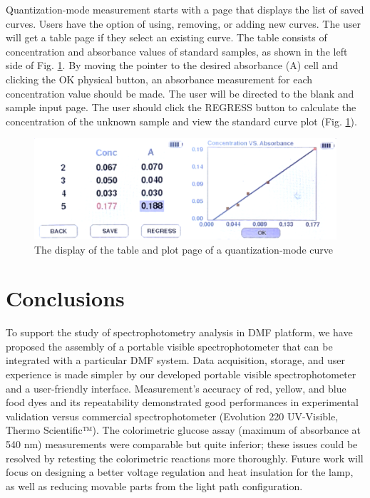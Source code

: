 \documentclass[conference]{IEEEtran}
\begin{document}
Quantization-mode measurement starts with a page that displays the list of saved curves.
Users have the option of using, removing, or adding new curves.
The user will get a table page if they select an existing curve.
The table consists of concentration and absorbance values of standard samples, as shown in the left side of Fig. \ref{lcd-conc}.
By moving the pointer to the desired absorbance (A) cell and clicking the OK physical button, an absorbance measurement for each concentration value should be made.
The user will be directed to the blank and sample input page.
The user should click the REGRESS button to calculate the concentration of the unknown sample and view the standard curve plot (Fig. \ref{lcd-conc}).

    \begin{figure}[htbp]
    \centerline{\includegraphics[scale=0.06]{lcd-conc.png}}
    \caption{The display of the table and plot page of a quantization-mode curve}
    \label{lcd-conc}
    \end{figure}

\section{Conclusions}
To support the study of spectrophotometry analysis in DMF platform, we have proposed the assembly of a portable visible spectrophotometer that can be integrated with a particular DMF system.
Data acquisition, storage, and user experience is made simpler by our developed portable visible spectrophotometer and a user-friendly interface.
Measurement's accuracy of red, yellow, and blue food dyes and its repeatability demonstrated good performances in experimental validation versus commercial spectrophotometer (Evolution 220 UV-Visible, Thermo Scientific™).
The colorimetric glucose assay (maximum of absorbance at 540 nm) measurements were comparable but quite inferior; these issues could be resolved by retesting the colorimetric reactions more thoroughly.
Future work will focus on designing a better voltage regulation and heat insulation for the lamp, as well as reducing movable parts from the light path configuration.
\end{document}
